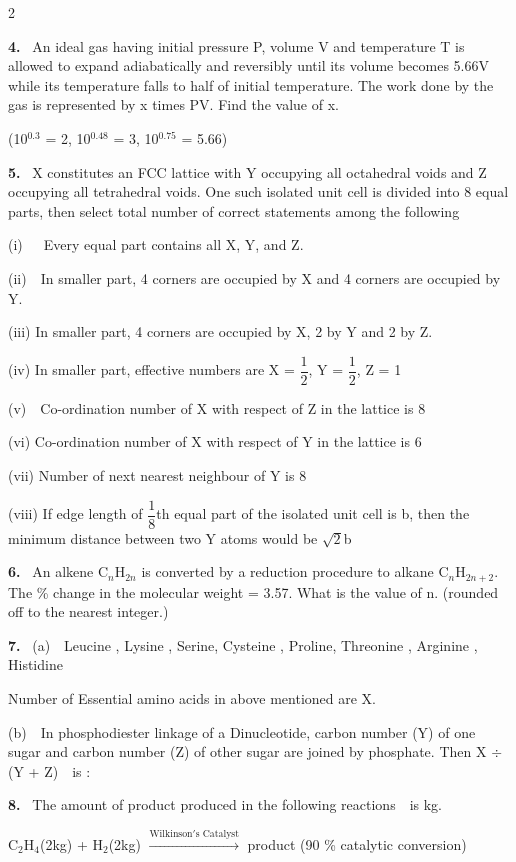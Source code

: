 \documentclass[10pt]{extarticle}
\newcommand{\papersec}[1]{\par\bigskip{\centering\Large\bfseries PAPER-#1\par}\medskip}
\newcommand{\qn}[1]{\par\smallskip\noindent\textbf{#1.}~}
\begin{document}
\begin{multicols}{2}
\qn{4} An ideal gas having initial pressure P, volume V and temperature T is allowed to expand adiabatically and reversibly until its volume becomes 5.66V while its temperature falls to half of initial temperature. The work done by the gas is represented by x times PV. Find the value of x.\par
(10$^{0.3}$ = 2, 10$^{0.48}$ = 3, 10$^{0.75}$ = 5.66)
\qn{5} X constitutes an FCC lattice with Y occupying all octahedral voids and Z occupying all tetrahedral voids. One such isolated unit cell is divided into 8 equal parts, then select total number of correct statements among the following\par
(i)\ \ \ Every equal part contains all X, Y, and Z.\par
(ii)\ \ In smaller part, 4 corners are occupied by X and 4 corners are occupied by Y.\par
(iii) In smaller part, 4 corners are occupied by X, 2 by Y and 2 by Z.\par
(iv) In smaller part, effective numbers are X = $\dfrac12$, Y = $\dfrac12$, Z = 1\par
(v)\ \ Co-ordination number of X with respect of Z in the lattice is 8\par
(vi) Co-ordination number of X with respect of Y in the lattice is 6\par
(vii) Number of next nearest neighbour of Y is 8\par
(viii) If edge length of $\dfrac18$th equal part of the isolated unit cell is b, then the minimum distance between two Y atoms would be $\sqrt2$b
\qn{6} An alkene C$_n$H$_{2n}$ is converted by a reduction procedure to alkane C$_n$H$_{2n+2}$. The \% change in the molecular weight = 3.57. What is the value of n. (rounded off to the nearest integer.)
\qn{7} (a)\ \ Leucine , Lysine , Serine, Cysteine , Proline, Threonine , Arginine , Histidine\par
\hspace*{1.2em}Number of Essential amino acids in above mentioned are X.\par
(b)\ \ In phosphodiester linkage of a Dinucleotide, carbon number (Y) of one sugar and carbon number (Z) of other sugar are joined by phosphate. Then X $\div$ (Y + Z)\ \ is :
\qn{8} The amount of product produced in the following reactions\ \ is \underline{\hspace{1cm}}kg.\par
C$_2$H$_4$(2kg) + H$_2$(2kg) $\xrightarrow{\text{Wilkinson}'\text{s Catalyst}}$ product (90 \% catalytic conversion)
\raggedcolumns
\papersec{2}

\end{multicols}
\end{document}
